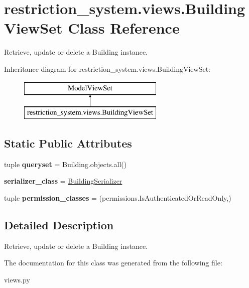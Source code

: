 \hypertarget{classrestriction__system_1_1views_1_1BuildingViewSet}{}\section{restriction\+\_\+system.\+views.\+Building\+View\+Set Class Reference}
\label{classrestriction__system_1_1views_1_1BuildingViewSet}


Retrieve, update or delete a Building instance.  


Inheritance diagram for restriction\+\_\+system.\+views.\+Building\+View\+Set\+:\begin{figure}[H]
\begin{center}
\leavevmode
\includegraphics[height=2.000000cm]{classrestriction__system_1_1views_1_1BuildingViewSet}
\end{center}
\end{figure}
\subsection*{Static Public Attributes}
\begin{DoxyCompactItemize}
\item 
\hypertarget{classrestriction__system_1_1views_1_1BuildingViewSet_a46f650c6a3b5ffe7fe0f2b78932cdd13}{}tuple {\bfseries queryset} = Building.\+objects.\+all()\label{classrestriction__system_1_1views_1_1BuildingViewSet_a46f650c6a3b5ffe7fe0f2b78932cdd13}

\item 
\hypertarget{classrestriction__system_1_1views_1_1BuildingViewSet_a40d135da625023910fa7f27c90ecd13d}{}{\bfseries serializer\+\_\+class} = \hyperlink{classrestriction__system_1_1serializers_1_1BuildingSerializer}{Building\+Serializer}\label{classrestriction__system_1_1views_1_1BuildingViewSet_a40d135da625023910fa7f27c90ecd13d}

\item 
\hypertarget{classrestriction__system_1_1views_1_1BuildingViewSet_a4b08fcfdb698a7f47f235797f6ff75e2}{}tuple {\bfseries permission\+\_\+classes} = (permissions.\+Is\+Authenticated\+Or\+Read\+Only,)\label{classrestriction__system_1_1views_1_1BuildingViewSet_a4b08fcfdb698a7f47f235797f6ff75e2}

\end{DoxyCompactItemize}


\subsection{Detailed Description}
Retrieve, update or delete a Building instance. 



The documentation for this class was generated from the following file\+:\begin{DoxyCompactItemize}
\item 
views.\+py\end{DoxyCompactItemize}
